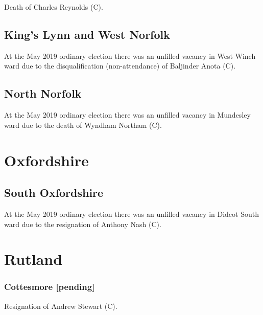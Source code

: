 \documentclass[a4paper,openany]{book}
\begin{document}
\begin{resultsiii}

Death of Charles Reynolds (C).

\subsection*{King's Lynn and West Norfolk}

At the May 2019 ordinary election there was an unfilled vacancy in West Winch ward due to the disqualification (non-attendance) of Baljinder Anota (C).

\subsection*{North Norfolk}

At the May 2019 ordinary election there was an unfilled vacancy in Mundesley ward due to the death of Wyndham Northam (C).

\section{Oxfordshire}

\subsection*{South Oxfordshire}

At the May 2019 ordinary election there was an unfilled vacancy in Didcot South ward due to the resignation of Anthony Nash (C).

\section{Rutland}

\subsubsection*{Cottesmore \hspace*{\fill}\nolinebreak[1]%
\enspace\hspace*{\fill}
[pending]}


Resignation of Andrew Stewart (C).


\end{resultsiii}
\end{document}
